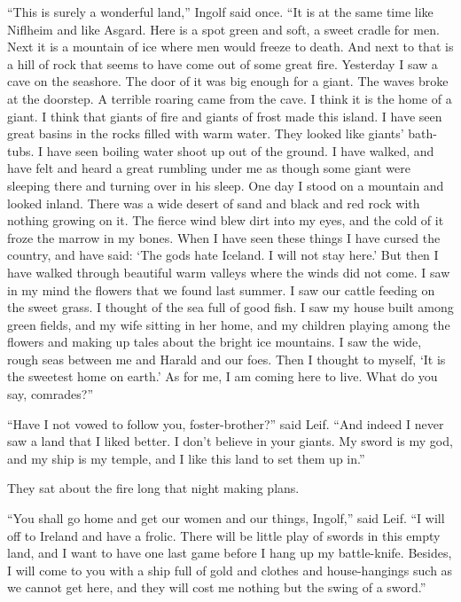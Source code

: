 ``This is surely a wonderful land,'' Ingolf said once. ``It is at the
same time like Niflheim and like Asgard. Here is a spot green and soft,
a sweet cradle for men. Next it is a mountain of ice where men would
freeze to death. And next to that is a hill of rock that seems to have
come out of some great fire. Yesterday I saw a cave on the seashore. The
door of it was big enough for a giant. The waves broke at the doorstep.
A terrible roaring came from the cave. I think it is the home of a
giant. I think that giants of fire and giants of frost made this island.
I have seen great basins in the rocks filled with warm water. They
looked like giants' bath-tubs. I have seen boiling water shoot up out of
the ground. I have walked, and have felt and heard a great rumbling
under me as though some giant were sleeping there and turning over in
his sleep. One day I stood on a mountain and looked inland. There was a
wide desert of sand and black and red rock with nothing growing on it.
The fierce wind blew dirt into my eyes, and the cold of it froze the
marrow in my bones. When I have seen these things I have cursed the
country, and have said: `The gods hate Iceland. I will not stay here.'
But then I have walked through beautiful warm valleys where the winds
did not come. I saw in my mind the flowers that we found last summer. I
saw our cattle feeding on the sweet grass. I thought of the sea full of
good fish. I saw my house built among green fields, and my wife sitting
in her home, and my children playing among the flowers and making up
tales about the bright ice mountains. I saw the wide, rough seas between
me and Harald and our foes. Then I thought to myself, `It is the
sweetest home on earth.' As for me, I am coming here to live. What do
you say, comrades?''

``Have I not vowed to follow you, foster-brother?'' said Leif. ``And
indeed I never saw a land that I liked better. I don't believe in your
giants. My sword is my god, and my ship is my temple, and I like this
land to set them up in.''

They sat about the fire long that night making plans.

``You shall go home and get our women and our things, Ingolf,'' said
Leif. ``I will off to Ireland and have a frolic. There will be little
play of swords in this empty land, and I want to have one last game
before I hang up my battle-knife. Besides, I will come to you with a
ship full of gold and clothes and house-hangings such as we cannot get
here, and they will cost me nothing but the swing of a sword.''

